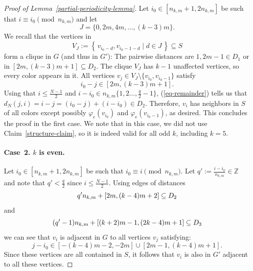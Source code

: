 \documentclass[a4paper,10pt,hidelinks]{amsart}
\newenvironment{claimproof}[1][\proofname]{\proof[#1]\renewcommand{\qedsymbol}{$\blacksquare$}}{\endproof}
\theoremstyle{definition}
\begin{document}
\begin{proof}[Proof of Lemma~\ref{partial-periodicity-lemma}]
\begin{claimproof}
        Let $i_0 \in [n_{k,m} + 1, 2n_{k, m}]$ be such that $i \equiv i_0 \pmod{n_{k,m}}$ and let
        $$J = \{0, 2m, 4m, \dots, (k - 3)m\}.$$ We recall that the vertices in $$V_J := \left\{\, v_{i_0 - d}, v_{i_0 - 1 - d} \mid d \in J \,\right\} \subseteq S$$ form a clique in $G$ (and thus in $G'$): The pairwise distances are $1, 2m - 1 \in D_1$ or in $[2m, (k - 3)m + 1] \subseteq D_2$. The clique $V_J$ has $k - 1$ unaffected vertices, so every color appears in it.
        All vertices $v_j \in V_J\setminus\{v_{i_0}, v_{i_0 - 1}\}$ satisfy 
        \begin{equation}\label{eq-remainder}
            i_0 - j \in [2m, (k - 3)m + 1].
        \end{equation}
        Using that $i \leq \frac{N-1}{2}$ and $i - i_0 \in n_{k,m}\{1,2\ldots,\frac{q}{2}-1\}$, (\ref{eq-remainder}) tells us that $d_N(j, i)=i-j=(i_0-j)+(i-i_0) \in D_2$.
        Therefore, $v_i$ has neighbors in $S$ of all colors except possibly $\varphi_e(v_{i_0})$ and $\varphi_e(v_{i_0 - 1})$, as desired. This concludes the proof in the first case. We note that in this case, we did not use Claim~\ref{structure-claim}, so it is indeed valid for all odd $k$, including $k=5$.

        \medskip

        \paragraph*{\textbf{Case~2.} $k$ is even.}

        Let $i_0 \in [n_{k, m} + 1, 2n_{k, m}]$ be such that $i_0 \equiv i  \pmod{n_{k, m}}$. Let $q' :=\frac{i - i_0}{n_{k, m}} \in \mathbb{Z}$ and note that $q' < \frac{q}{2}$ since $i\le \frac{N-1}{2}$. Using edges of distances \begin{equation}\notag
            q'n_{k, m} + [2m, (k - 4)m + 2] \subseteq D_2
        \end{equation} 
        and 
        \begin{equation}\notag
            (q'-1)n_{k, m} + [(k + 2)m - 1, (2k - 4)m + 1] \subseteq D_3
        \end{equation}
        we can see that $v_{i}$ is adjacent in $G$ to all vertices $v_j$ satisfying:
        \begin{equation}\label{forbidden-difs-eqn}
            j - i_0 \in [- (k-4)m - 2, - 2m] \cup [2m - 1, (k-4)m + 1].
        \end{equation}
Since these vertices are all contained in $S$, it follows that $v_i$ is also in $G'$ adjacent to all these vertices.
        

\end{claimproof}
\end{proof}
\end{document}
